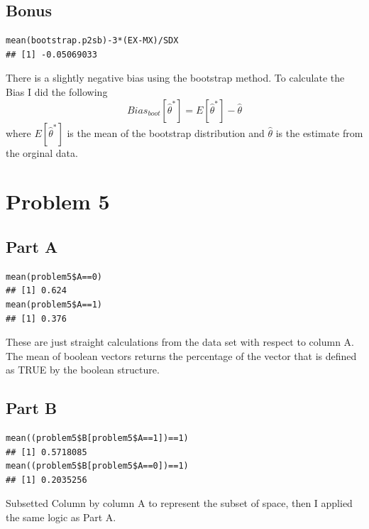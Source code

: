 \documentclass{article}\usepackage[]{graphicx}\usepackage[]{color}
\makeatletter
\newenvironment{kframe}{%
 \def\at@end@of@kframe{}%
 \ifinner\ifhmode%
  \def\at@end@of@kframe{\end{minipage}}%
  \begin{minipage}{\columnwidth}%
 \fi\fi%
 \def\FrameCommand##1{\hskip\@totalleftmargin \hskip-\fboxsep
 \colorbox{shadecolor}{##1}\hskip-\fboxsep
     \hskip-\linewidth \hskip-\@totalleftmargin \hskip\columnwidth}%
 \MakeFramed {\advance\hsize-\width
   \@totalleftmargin\z@ \linewidth\hsize
   \@setminipage}}%
 {\par\unskip\endMakeFramed%
 \at@end@of@kframe}
\newenvironment{knitrout}{}{} %
\makeatother
\begin{document}
\subsection*{Bonus}
\begin{knitrout}
\color{fgcolor}\begin{kframe}
\begin{verbatim}
mean(bootstrap.p2sb)-3*(EX-MX)/SDX
## [1] -0.05069033
\end{verbatim}
\end{kframe}
\end{knitrout}
There is a slightly negative bias using the bootstrap method. To calculate the Bias I did the following 
\begin{equation}
Bias_{boot}[\hat\theta^*]=E[\hat\theta^*]-\hat\theta
\end{equation}
where $E[\hat\theta^*]$ is the mean of the bootstrap distribution and $\hat\theta$ is the estimate from the orginal data.
\section*{Problem 5}
\subsection*{Part A}
\begin{knitrout}
\color{fgcolor}\begin{kframe}
\begin{verbatim}
mean(problem5$A==0)
## [1] 0.624
mean(problem5$A==1)
## [1] 0.376
\end{verbatim}
\end{kframe}
\end{knitrout}
These are just straight calculations from the data set with respect to column A. The mean of boolean vectors returns the percentage of the vector that is defined as TRUE by the boolean structure.
\subsection*{Part B}
\begin{knitrout}
\color{fgcolor}\begin{kframe}
\begin{verbatim}
mean((problem5$B[problem5$A==1])==1)
## [1] 0.5718085
mean((problem5$B[problem5$A==0])==1)
## [1] 0.2035256
\end{verbatim}
\end{kframe}
\end{knitrout}
Subsetted Column by column A to represent the subset of space, then I applied the same logic as Part A. 
\end{document}
